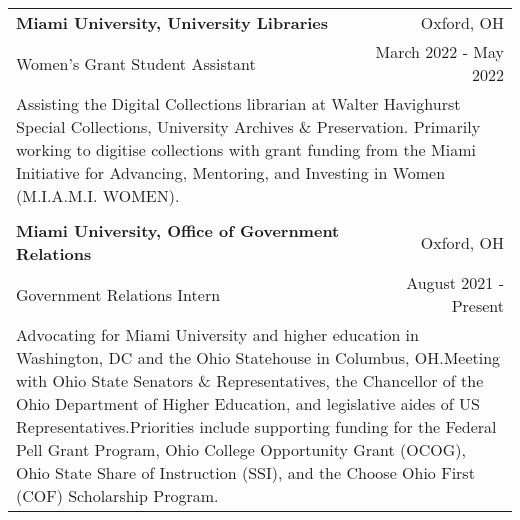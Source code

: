 \documentclass[letterpaper,8pt]{article} %
\begin{document}
{\begin{tabular*}{\linewidth}{@{\extracolsep{\fill}} lr }

\textbf{Miami University, University Libraries} & \footnotesize{Oxford, OH}\\
\footnotesize{Women's Grant Student Assistant} & \footnotesize{March 2022 - May 2022}\\
\multicolumn{2}{p{\linewidth}}{\footnotesize{Assisting the Digital Collections librarian at Walter Havighurst Special Collections, University Archives \& Preservation. Primarily working to digitise collections with grant funding from the Miami Initiative for Advancing, Mentoring, and Investing in Women (M.I.A.M.I. WOMEN).}}\\
\multicolumn{2}{c}{} \\


\textbf{Miami University, Office of Government Relations} & \footnotesize{Oxford, OH}\\
\footnotesize{Government Relations Intern} & \footnotesize{August 2021 - Present}\\
\multicolumn{2}{p{\linewidth}}{\footnotesize{Advocating for Miami University and higher education in Washington, DC and the Ohio Statehouse in Columbus, OH.\@ Meeting with Ohio State Senators \& Representatives, the Chancellor of the Ohio Department of Higher Education, and legislative aides of US Representatives.\@ Priorities include supporting funding for the Federal Pell Grant Program, Ohio College Opportunity Grant (OCOG), Ohio State Share of Instruction (SSI), and the Choose Ohio First (COF) Scholarship Program.}}\\


\end{tabular*}}\\

\end{document}
